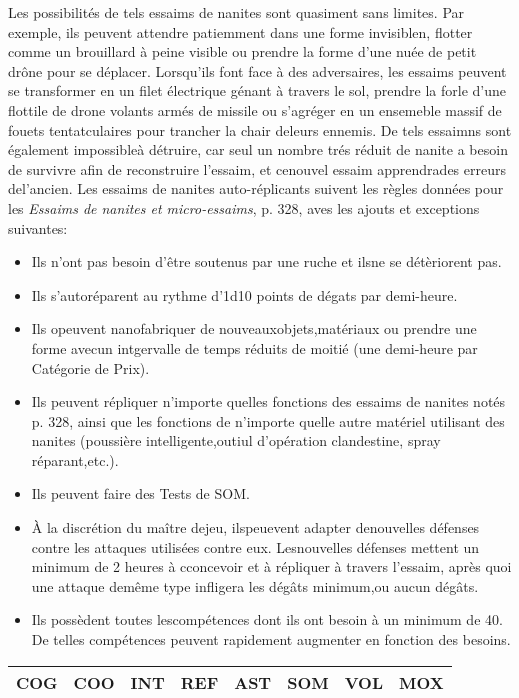 {Les possibilités de tels essaims de nanites sont quasiment sans limites. Par exemple, ils peuvent attendre patiemment dans une forme invisiblen, flotter comme un brouillard à peine visible ou prendre la forme d'une nuée de petit drône pour se déplacer. Lorsqu'ils font face à des adversaires, les essaims peuvent se transformer en un filet électrique génant à travers le sol, prendre la forle d'une flottile de drone volants armés de missile ou s'agréger en un ensemeble massif de fouets tentatculaires pour trancher la chair deleurs ennemis. De tels essaimns sont également impossibleà détruire, car seul un nombre trés réduit de nanite a besoin de survivre afin de reconstruire l'essaim, et cenouvel essaim apprendrades erreurs del'ancien. Les essaims de nanites auto-réplicants suivent les règles données pour les \textit{Essaims de nanites et micro-essaims}, p. 328, aves les ajouts et exceptions suivantes: 

\begin{itemize} \item Ils n'ont pas besoin d'être soutenus par une ruche et ilsne se détèriorent pas. \item Ils s'autoréparent au rythme d'1d10 points de dégats par demi-heure. \item Ils opeuvent nanofabriquer de nouveauxobjets,matériaux ou prendre une forme avecun intgervalle de temps réduits de moitié (une demi-heure par Catégorie de Prix). \item Ils peuvent répliquer n'importe quelles fonctions des essaims de nanites notés p. 328, ainsi que les fonctions de n'importe quelle autre matériel utilisant des nanites (poussière intelligente,outiul d'opération clandestine, spray réparant,etc.). \item Ils peuvent faire des Tests de SOM. \item À la discrétion du maître dejeu, ilspeuevent adapter denouvelles défenses contre les attaques utilisées contre eux. Lesnouvelles défenses mettent un minimum de 2 heures à cconcevoir et à répliquer à travers l'essaim, après quoi une attaque demême type infligera les dégâts minimum,ou aucun dégâts. \item Ils possèdent toutes lescompétences dont ils ont besoin à un minimum de 40. De telles compétences peuvent rapidement augmenter en fonction des besoins. \end{itemize} 

\begin{tabular}{|l|l|l|l|l|l|l|l|} \hline

COG &COO &INT &REF &AST &SOM &VOL &MOX \\ \hline


\end{tabular}}
